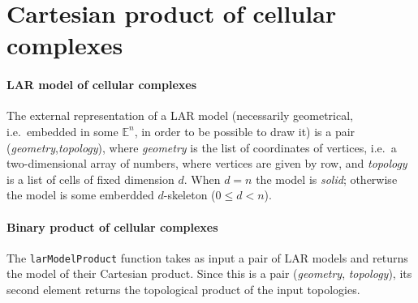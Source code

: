 \documentclass[11pt,oneside]{article}	%
\def\E{\mathbb{E}}
\begin{document}
\section{Cartesian product of cellular complexes}
\label{sec:product}

\paragraph{LAR model of cellular complexes}

The external representation of a LAR model (necessarily geometrical, i.e.~embedded in some $\E^n$, in order to be possible to draw it) is a pair (\emph{geometry},\emph{topology}), where \emph{geometry} is the list of coordinates of vertices, i.e.~a two-dimensional array of numbers, where vertices are given by row, and \emph{topology} is a list of cells of fixed dimension $d$. When $d=n$ the model is \emph{solid}; otherwise  the model is some emberdded $d$-skeleton ($0\leq d <n$).

\paragraph{Binary product of cellular complexes}
The \texttt{larModelProduct} function takes as input a pair of LAR models and returns the model of their Cartesian product. Since this is a pair (\emph{geometry}, \emph{topology}), its second element returns the topological product of the input topologies.
\end{document}
